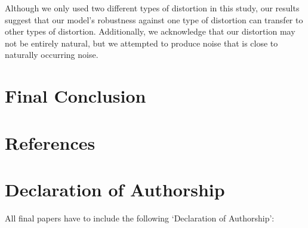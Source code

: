 \documentclass[a4paper]{article}
\begin{document}
Although we only used two different types of distortion in this study, our results suggest that our model's robustness against one type of distortion can transfer to other types of distortion. Additionally, we acknowledge that our distortion may not be entirely natural, but we attempted to produce noise that is close to naturally occurring noise.


\section{Final Conclusion}


\newpage
\section*{References}







\section*{Declaration of Authorship}
All final papers have to include the following ‘Declaration of Authorship’:
\end{document}
